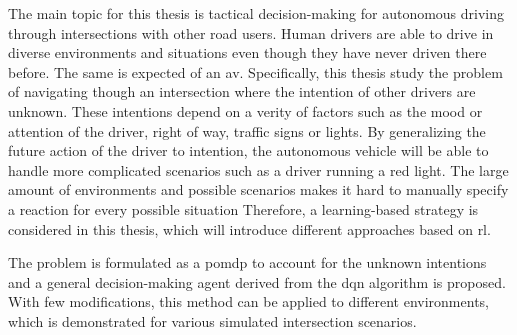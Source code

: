 The main topic for this thesis is tactical decision-making for autonomous driving through intersections with other road users. Human drivers are able to drive in diverse environments and situations even though they have never driven there before. The same is expected of an \gls{av}. Specifically, this thesis study the problem of navigating though an intersection where the intention of other drivers are unknown. These intentions depend on a verity of factors such as the mood or attention of the driver, right of way, traffic signs or lights. By generalizing the future action of the driver to intention, the autonomous vehicle will be able to handle more complicated scenarios such as a driver running a red light. 
The large amount of environments and possible scenarios makes it hard to manually specify a reaction for every possible situation
Therefore, a learning-based strategy is considered in this thesis, which will introduce different approaches based on \gls{rl}. 

The problem is formulated as a \gls{pomdp} to account for the unknown intentions and a general decision-making agent derived from the \gls{dqn} algorithm is proposed. With few modifications, this method can be applied to different environments, which is demonstrated for various simulated intersection scenarios. 






